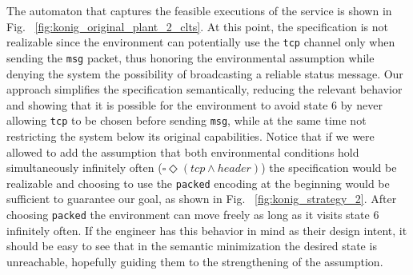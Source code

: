 The automaton that captures the feasible executions of the service is shown in Fig. ~\ref{fig:konig_original_plant_2_clts}. At this point, the specification is not realizable since the environment can potentially use the \texttt{tcp} channel only when sending the \texttt{msg} packet, thus honoring the environmental assumption while denying the system the possibility of broadcasting a reliable status message.
Our approach simplifies the specification semantically, reducing the relevant behavior and showing that it is possible for the environment to avoid state 6 by never allowing \texttt{tcp} to be chosen before sending \texttt{msg}, while at the same time not restricting the system below its original capabilities.
Notice that if we were allowed to add the assumption that both environmental conditions hold simultaneously infinitely often ($\square \Diamond (tcp \wedge header)$) the specification would be realizable and choosing to use the \texttt{packed} encoding at the beginning would be sufficient to guarantee our goal, as shown in Fig. ~\ref{fig:konig_strategy_2}. After choosing \texttt{packed} the environment can move freely as long as it visits state 6 infinitely often. If the engineer has this behavior in mind as their design intent, it should be easy to see that in the semantic minimization the desired state is unreachable, hopefully guiding them to the strengthening of the assumption. 


